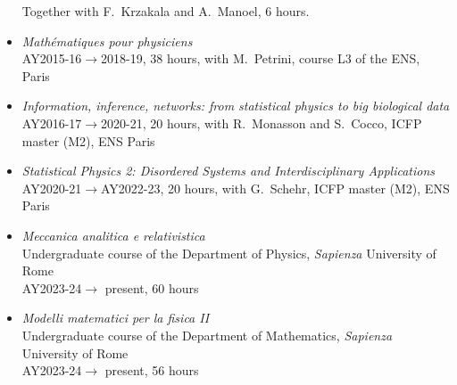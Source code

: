 \documentclass[a4paper,10pt]{article}
\begin{document}
\begin{itemize}
Together with F.~Krzakala and A.~Manoel, 6 hours.
\item {\it Math\'ematiques pour physiciens} \\
AY2015-16$\to$2018-19, 38 hours, with M.~Petrini,
course L3 of the ENS, Paris  
\item {\it Information, inference, networks: from statistical physics to big biological data} \\
AY2016-17$\to$2020-21, 20 hours, with R.~Monasson and S.~Cocco, 
ICFP master (M2), ENS Paris
\item {\it Statistical Physics 2: Disordered Systems and Interdisciplinary Applications} \\
AY2020-21$\to$AY2022-23, 20 hours, with G.~Schehr, ICFP master (M2), ENS Paris
\item {\it Meccanica analitica e relativistica} \\
Undergraduate course of the Department of Physics, 
{\it Sapienza} University of Rome  \\
AY2023-24$\to$ present, 60 hours
\item {\it Modelli matematici per la fisica II} \\
Undergraduate course of the Department of Mathematics, 
{\it Sapienza} University of Rome  \\
AY2023-24$\to$ present, 56 hours



\end{itemize}

\clearpage

\vskip10pt
\end{document}

